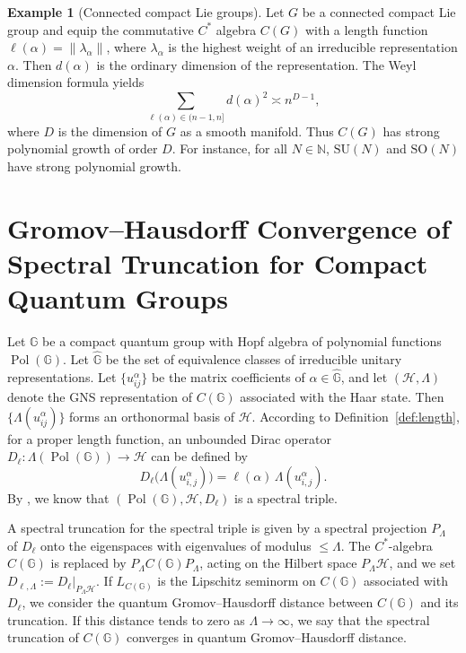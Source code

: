 \documentclass[12pt, reqno]{amsart}
\theoremstyle{definition}
\newtheorem{example}[theorem]{Example}
\theoremstyle{remark}
\numberwithin{equation}{section}
\begin{document}
\begin{example}[Connected compact Lie groups]
    Let \(G\) be a connected compact Lie group and equip the commutative
    $C^*$ algebra \(C(G)\) with a length function
    \(\ell(\alpha)=\|\lambda_\alpha\|\), where \(\lambda_\alpha\) is the highest 
    weight of an irreducible representation \(\alpha\).
    Then \(d(\alpha)\) is the ordinary dimension of the representation.
    The Weyl dimension formula yields
    \[
    \sum_{\ell(\alpha)\in(n-1,n]} d(\alpha)^2 \asymp n^{D-1},
    \]
    where \(D\) is the dimension of \(G\) as a smooth manifold.
    Thus \(C(G)\) has strong polynomial growth of order \(D\).
    For instance, for all \(N\in\mathbb{N}\), \(\mathrm{SU}(N)\) and 
    \(\mathrm{SO}(N)\) have strong polynomial growth.
\end{example}












\section{Gromov--Hausdorff Convergence of Spectral
Truncation for Compact Quantum Groups}

Let $\mathbb{G}$ be a compact quantum group with Hopf algebra of polynomial 
functions $\operatorname{Pol}(\mathbb{G})$. Let $\widehat{\mathbb{G}}$ be the 
set of equivalence classes of irreducible unitary representations.
Let $\{u_{ij}^\alpha\}$ be the matrix coefficients of 
$\alpha \in \widehat{\mathbb{G}}$, and let $(\mathcal{H}, \Lambda)$ denote the 
GNS representation of $C(\mathbb{G})$ associated with the Haar state. Then 
$\{\Lambda(u_{ij}^\alpha)\}$ forms an orthonormal basis of $\mathcal{H}$.
According to Definition~\ref{def:length}, for a proper length function, an 
unbounded Dirac operator 
$D_\ell:\Lambda(\operatorname{Pol}(\mathbb{G}))\to \mathcal{H}$ can be defined by
\[
D_\ell\bigl(\Lambda(u_{i,j}^\alpha)\bigr) = \ell(\alpha)\,\Lambda(u_{i,j}^\alpha) .
\]
By \cite[Lemma~5.4]{23}, we know that 
$(\operatorname{Pol}(\mathbb{G}),\mathcal{H},D_\ell)$ is a spectral triple. 

A spectral truncation for the spectral triple is given by a spectral 
projection $P_\Lambda$ of $D_\ell$ onto the eigenspaces with eigenvalues of 
modulus $\leq\Lambda$. The $C^*$-algebra $C(\mathbb{G})$ is replaced by 
$P_\Lambda C(\mathbb{G}) P_\Lambda$, acting on the Hilbert space 
$P_\Lambda \mathcal{H}$, and we set 
$D_{\ell,\Lambda}:=D_\ell|_{P_\Lambda\mathcal{H}}$. 
If $L_{C(\mathbb{G})}$ is the Lipschitz seminorm on $C(\mathbb{G})$ associated with $D_\ell$, we 
consider the quantum Gromov--Hausdorff distance between $C(\mathbb{G})$ and 
its truncation. If this distance tends to zero as $\Lambda\to\infty$, we say 
that the spectral truncation of $C(\mathbb{G})$ converges in quantum 
Gromov--Hausdorff distance. 
\end{document}
